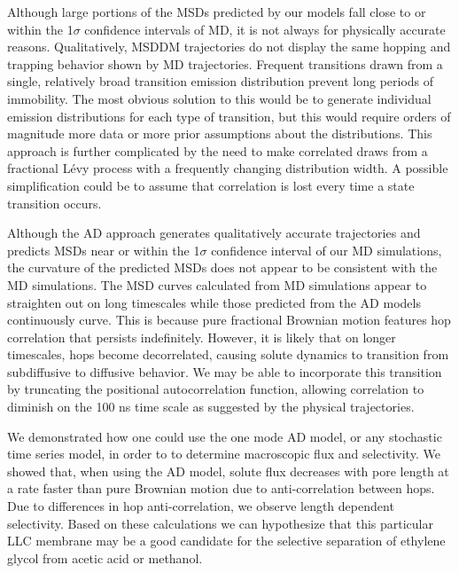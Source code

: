 \documentclass[journal=ancac3,manuscript=article,layout=twocolumn]{achemso}
\begin{document}
  Although large portions of the MSDs predicted by our models fall close to or
  within the 1$\sigma$ confidence intervals of MD, it is not always for
  physically accurate reasons. Qualitatively, MSDDM trajectories do not display
  the same hopping and trapping behavior shown by MD trajectories. Frequent
  transitions drawn from a single, relatively broad transition emission
  distribution prevent long periods of immobility. The most obvious solution to
  this would be to generate individual emission distributions for each type of
  transition, but this would require orders of magnitude more data or more
  prior assumptions about the distributions. This approach is further
  complicated by the need to make correlated draws from a fractional L\'evy
  process with a frequently changing distribution width. A possible
  simplification could be to assume that correlation is lost every time a state
  transition occurs.

  Although the AD approach generates qualitatively accurate trajectories and
  predicts MSDs near or within the 1$\sigma$ confidence interval of our MD
  simulations, the curvature of the predicted MSDs does not appear to be
  consistent with the MD simulations. The MSD curves calculated from MD
  simulations appear to straighten out on long timescales while those predicted
  from the AD models continuously curve. This is because pure fractional Brownian motion
  features hop correlation that persists indefinitely.
  However, it is likely that on longer timescales, hops become decorrelated, 
  causing solute dynamics to transition from subdiffusive to diffusive behavior.
  We may be able to incorporate this transition by truncating the positional 
  autocorrelation function, allowing correlation to diminish on the 100 ns 
  time scale as suggested by the physical trajectories.

  We demonstrated how one could use the one mode AD model,
  or any stochastic time series model,
  in order to to
  determine macroscopic flux and selectivity. We showed that, when using the AD
  model, solute flux decreases with pore length at a rate faster than pure
  Brownian motion due to anti-correlation between hops.
  Due to differences in hop anti-correlation, we observe length dependent
  selectivity. Based on these calculations we can hypothesize that this
  particular LLC membrane may be a good candidate for the selective separation
  of ethylene glycol from acetic acid or methanol.
\end{document}
